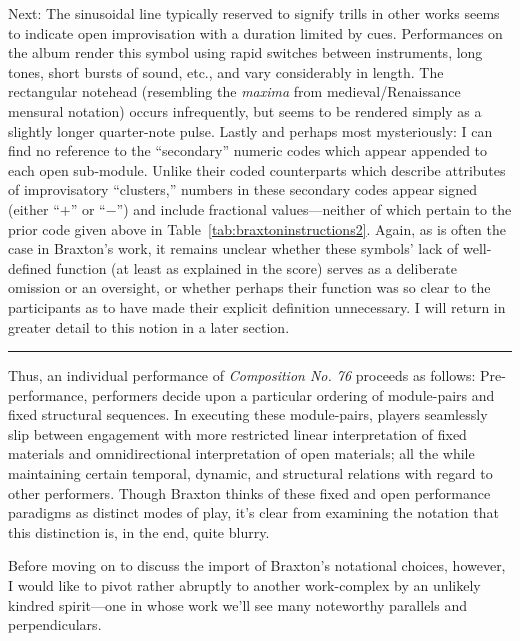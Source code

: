         Next: The sinusoidal line typically reserved to signify trills in other works seems to indicate open improvisation with a duration limited by cues. Performances on the album render this symbol using rapid switches between instruments, long tones, short bursts of sound, etc., and vary considerably in length. The rectangular notehead (resembling the \textit{maxima} from medieval/Renaissance mensural notation) occurs infrequently, but seems to be rendered simply as a slightly longer quarter-note pulse. Lastly and perhaps most mysteriously: I can find no reference to the ``secondary'' numeric codes which appear appended to each open sub-module. Unlike their coded counterparts which describe attributes of improvisatory ``clusters,'' numbers in these secondary codes appear signed (either ``$+$'' or ``$-$'') and include fractional values---neither of which pertain to the prior code given above in Table~\ref{tab:braxtoninstructions2}. Again, as is often the case in Braxton's work, it remains unclear whether these symbols' lack of well-defined function (at least as explained in the score) serves as a deliberate omission or an oversight, or whether perhaps their function was so clear to the participants as to have made their explicit definition unnecessary. I will return in greater detail to this notion in a later section.

            \begin{center}
            \vspace{-10pt}
            \noindent\rule{3cm}{0.4pt}
            \end{center}

        Thus, an individual performance of \textit{Composition No. 76} proceeds as follows: Pre-performance, performers decide upon a particular ordering of module-pairs and fixed structural sequences. In executing these module-pairs, players seamlessly slip between engagement with more restricted linear interpretation of fixed materials and omnidirectional interpretation of open materials; all the while maintaining certain temporal, dynamic, and structural relations with regard to other performers. Though Braxton thinks of these fixed and open performance paradigms as distinct modes of play, it's clear from examining the notation that this distinction is, in the end, quite blurry.
    
        Before moving on to discuss the import of Braxton's notational choices, however, I would like to pivot rather abruptly to another work-complex by an unlikely kindred spirit---one in whose work we'll see many noteworthy parallels and perpendiculars.
    
